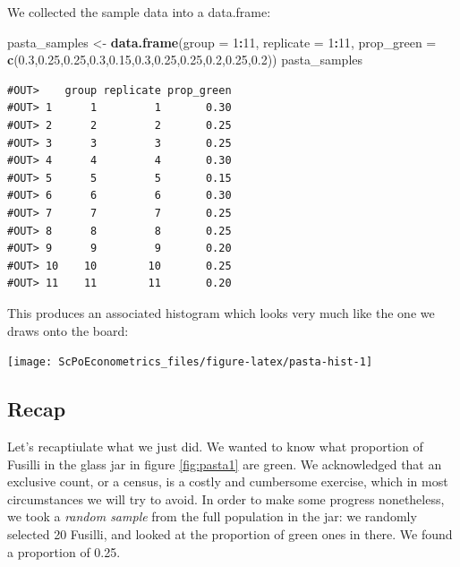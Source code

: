 \documentclass[]{book}
\newenvironment{Shaded}{\begin{snugshade}}{\end{snugshade}}
\newcommand{\DataTypeTok}[1]{\textcolor[rgb]{0.13,0.29,0.53}{#1}}
\newcommand{\DecValTok}[1]{\textcolor[rgb]{0.00,0.00,0.81}{#1}}
\newcommand{\FloatTok}[1]{\textcolor[rgb]{0.00,0.00,0.81}{#1}}
\newcommand{\KeywordTok}[1]{\textcolor[rgb]{0.13,0.29,0.53}{\textbf{#1}}}
\newcommand{\NormalTok}[1]{#1}
\newcommand{\OperatorTok}[1]{\textcolor[rgb]{0.81,0.36,0.00}{\textbf{#1}}}
\newcommand{\StringTok}[1]{\textcolor[rgb]{0.31,0.60,0.02}{#1}}
\begin{document}
We collected the sample data into a data.frame:

\begin{Shaded}
\begin{Highlighting}[]
\NormalTok{pasta_samples <-}\StringTok{ }\KeywordTok{data.frame}\NormalTok{(}\DataTypeTok{group =} \DecValTok{1}\OperatorTok{:}\DecValTok{11}\NormalTok{, }\DataTypeTok{replicate =} \DecValTok{1}\OperatorTok{:}\DecValTok{11}\NormalTok{, }\DataTypeTok{prop_green =} \KeywordTok{c}\NormalTok{(}\FloatTok{0.3}\NormalTok{,}\FloatTok{0.25}\NormalTok{,}\FloatTok{0.25}\NormalTok{,}\FloatTok{0.3}\NormalTok{,}\FloatTok{0.15}\NormalTok{,}\FloatTok{0.3}\NormalTok{,}\FloatTok{0.25}\NormalTok{,}\FloatTok{0.25}\NormalTok{,}\FloatTok{0.2}\NormalTok{,}\FloatTok{0.25}\NormalTok{,}\FloatTok{0.2}\NormalTok{))}
\NormalTok{pasta_samples}
\end{Highlighting}
\end{Shaded}

\begin{verbatim}
#OUT>    group replicate prop_green
#OUT> 1      1         1       0.30
#OUT> 2      2         2       0.25
#OUT> 3      3         3       0.25
#OUT> 4      4         4       0.30
#OUT> 5      5         5       0.15
#OUT> 6      6         6       0.30
#OUT> 7      7         7       0.25
#OUT> 8      8         8       0.25
#OUT> 9      9         9       0.20
#OUT> 10    10        10       0.25
#OUT> 11    11        11       0.20
\end{verbatim}

This produces an associated histogram which looks very much like the one we draws onto the board:

\begin{center}\texttt{[image: ScPoEconometrics\_files/figure-latex/pasta-hist-1]} \end{center}

\hypertarget{recap}{%
\subsection{Recap}\label{recap}}

Let's recaptiulate what we just did. We wanted to know what proportion of Fusilli in the glass jar in figure \ref{fig:pasta1} are green. We acknowledged that an exclusive count, or a census, is a costly and cumbersome exercise, which in most circumstances we will try to avoid. In order to make some progress nonetheless, we took a \emph{random sample} from the full population in the jar: we randomly selected 20 Fusilli, and looked at the proportion of green ones in there. We found a proportion of 0.25.
\end{document}
